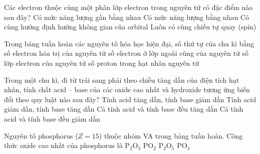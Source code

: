 \begin{ex}
    Các electron thuộc cùng một phân lớp electron trong nguyên tử có đặc điểm nào sau đây?
    \choice
    {Có mức năng lượng gần bằng nhau}
    {\True Có mức năng lượng bằng nhau}
    {Có cùng hướng định hướng không gian của orbital}
    {Luôn có cùng chiều tự quay (spin)}
\end{ex}

\begin{ex}
    Trong bảng tuần hoàn các nguyên tố hóa học hiện đại, số thứ tự của chu kì bằng
    \choice
    {số electron hóa trị của nguyên tử}
    {số electron ở lớp ngoài cùng của nguyên tử}
    {\True số lớp electron của nguyên tử}
    {số proton trong hạt nhân nguyên tử}
\end{ex}

\begin{ex}
    Trong một chu kì, đi từ trái sang phải theo chiều tăng dần của điện tích hạt nhân, tính chất acid -- base của các oxide cao nhất và hydroxide tương ứng biến đổi theo quy luật nào sau đây?
    \choice
    {\True Tính acid tăng dần, tính base giảm dần}
    {Tính acid giảm dần, tính base tăng dần}
    {Cả tính acid và tính base đều tăng dần}
    {Cả tính acid và tính base đều giảm dần}
\end{ex}

\begin{ex}
    Nguyên tố phosphorus ($Z = 15$) thuộc nhóm VA trong bảng tuần hoàn. Công thức oxide cao nhất của phosphorus là
    \choice
    {$\text{P}_2\text{O}_3$}
    {$\text{PO}_2$}
    {\True $\text{P}_2\text{O}_5$}
    {$\text{PO}_3$}
\end{ex}

